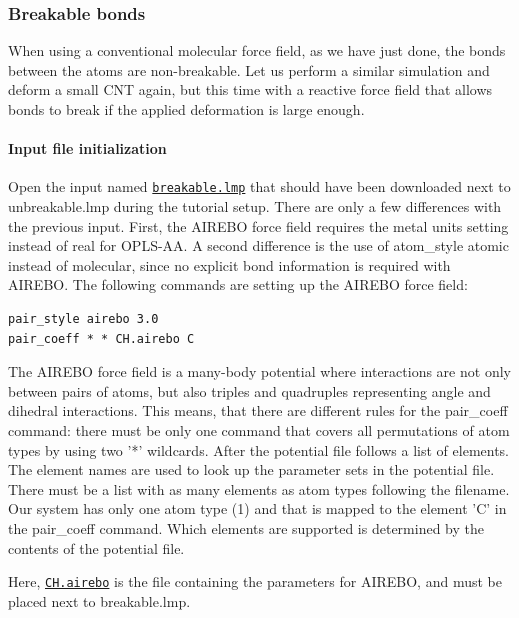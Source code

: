 \documentclass[9pt,tutorial]{livecoms}
\newcommand{\lmpcmd}[1]{\colorbox{listing}{\textcolor{command}{\small{#1}}}} %
\newcommand{\dwlcmd}[1]{\textcolor{download}{\texttt{#1}}} %
\newcommand{\filepath}{https://raw.githubusercontent.com/lammpstutorials/lammpstutorials-article/main/files/}
\begin{document}
\subsubsection{Breakable bonds}

When using a conventional molecular force field, as we have just done,
the bonds between the atoms are non-breakable.  Let us perform a similar
simulation and deform a small CNT again, but this time with a reactive
force field that allows bonds to break if the applied deformation is
large enough.

\paragraph{Input file initialization}

Open the input named \href{\filepath tutorial2/breakable.lmp}{\dwlcmd{breakable.lmp}}
that should have been downloaded next to \lmpcmd{unbreakable.lmp} during
the tutorial setup.  There are only a few differences with the previous
input.  First, the AIREBO force field requires the \lmpcmd{metal} units
setting instead of \lmpcmd{real} for OPLS-AA.  A second difference is
the use of \lmpcmd{atom\_style atomic} instead of
\lmpcmd{molecular}, since no explicit bond information is required with
AIREBO.  The following commands are setting up the AIREBO force field:
\begin{lstlisting}
pair_style airebo 3.0
pair_coeff * * CH.airebo C
\end{lstlisting}
\begin{note} {\color{blue}The AIREBO force field is a many-body
    potential where interactions are not only between pairs of atoms,
    but also triples and quadruples representing angle and dihedral
    interactions.  This means, that there are different rules for the
    \lmpcmd{pair\_coeff} command: there must be only one command that
    covers all permutations of atom types by using two '*' wildcards.
    After the potential file follows a list of elements.  The element
    names are used to look up the parameter sets in the potential file.
    There must be a list with as many elements as atom types following
    the filename.  Our system has only one atom type (1) and that is
    mapped to the element 'C' in the \lmpcmd{pair\_coeff} command.
    Which elements are supported is determined by the contents of the
    potential file.  }
\end{note}
Here, \href{\filepath tutorial2/CH.airebo}{\dwlcmd{CH.airebo}} is the
file containing the parameters for AIREBO, and must be placed next to
\lmpcmd{breakable.lmp}.
\end{document}
